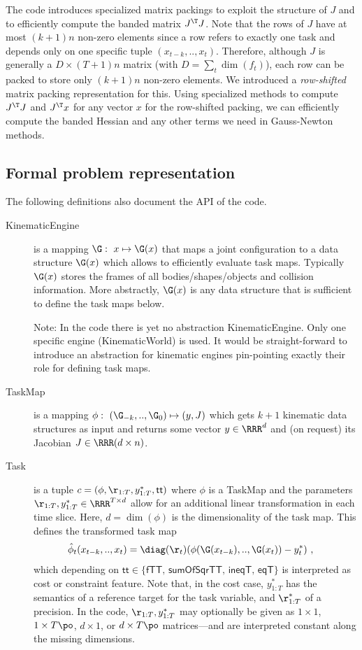 \documentclass[10pt,fleqn,twoside]{article}
\begin{document}
{{The code introduces specialized matrix packings to exploit the
structure of $J$ and to efficiently compute the banded matrix $J^\T
J$. Note that the rows of $J$ have at most $(k+1)n$ non-zero elements
since a row refers to exactly one task and depends only on one
specific tuple $(x_{t-k},..,x_t)$. Therefore, although $J$ is
generally a $D\times (T+1)n$ matrix (with $D=\sum_t \dim(f_t)$),
each row can be packed to store only $(k+1)n$ non-zero elements. We
introduced a \emph{row-shifted} matrix packing representation for
this. Using specialized methods to compute $J^\T J$ and $J^\T x$ for
any vector $x$ for the row-shifted packing, we can efficiently compute
the banded Hessian and any other terms we need in Gauss-Newton
methods.


\subsection{Formal problem representation}

The following definitions also document the API of the code.
\begin{description}
\item[KinematicEngine] is a mapping $\G:~ x \mapsto \G(x)$
that maps a joint configuration to a data structure $\G(x)$ which
allows to efficiently evaluate task maps. Typically $\G(x)$ stores
the frames of all bodies/shapes/objects and collision
information. More abstractly, $\G(x)$ is any data structure that is
sufficient to define the task maps below.

Note: In the code there is yet no abstraction KinematicEngine. Only
one specific engine (KinematicWorld) is used. It would be
straight-forward to introduce an abstraction for kinematic engines
pin-pointing exactly their role for defining task maps.

\item[TaskMap] is a mapping $\phi:~ (\G_{-k},..,\G_0) \mapsto
(y,J)$ which gets $k+1$ kinematic data structures as input and returns
some vector $y\in\RRR^d$ and (on request) its Jacobian $J\in\RRR(d\times n)$.

\item[Task] is a tuple $c=(\phi, \r_{1:T},
 y^*_{1:T},\textsf{tt})$ where $\phi$ is a TaskMap and the
parameters $\r_{1:T},y^*_{1:T} \in\RRR^{T\times d}$ allow for an
additional linear transformation in each time slice. Here,
$d=\dim(\phi)$ is the dimensionality of the task map. This defines the
transformed task map
\begin{align}
\hat\phi_t(x_{t-k},..,x_t)
& = \diag(\r_t) (\phi(\G(x_{t-k}),..,\G(x_t)) - y^*_t) ~,
\end{align}
which depending on $\textsf{tt}\in\{\textsf{fTT, sumOfSqrTT, ineqT, eqT}\}$ is
interpreted as cost or constraint feature. Note that, in the cost case,
$y^*_{1:T}$ has the semantics of a reference target for the task
variable, and $\r^*_{1:T}$ of a precision. In the code,
$\r_{1:T},y^*_{1:T}$ may optionally be given as $1\times 1$, $1\times
T\po$, $d\times 1$, or $d\times T\po$ matrices---and are interpreted
constant along the missing dimensions.


\end{description}}}
\end{document}
